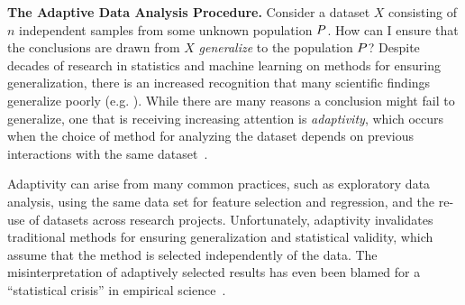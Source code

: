  \textbf{The Adaptive Data Analysis Procedure.}
 Consider a dataset $X$ consisting of $n$ independent samples from some unknown population $P$. How can I ensure that the conclusions are drawn from $X$ \emph{generalize} to the population $P$? Despite decades of research in statistics and machine learning on methods for ensuring generalization, there is an increased recognition that many scientific findings generalize poorly (e.g. 
 \cite{Ioannidis05,GelmanL13}
 ). While there are many reasons a conclusion might fail to generalize, one that is receiving increasing attention is \emph{adaptivity}, which occurs when the choice of method for analyzing the dataset depends on previous interactions with the same dataset~\cite{GelmanL13}.
 
  Adaptivity can arise from many common practices, such as exploratory data analysis, using the same data set for feature selection and regression, and the re-use of datasets across research projects. Unfortunately, adaptivity invalidates traditional methods for ensuring generalization and statistical validity, which assume that the method is selected independently of the data. The misinterpretation of adaptively selected results has even been blamed for a ``statistical crisis'' in empirical science~\cite{GelmanL13}.
 
